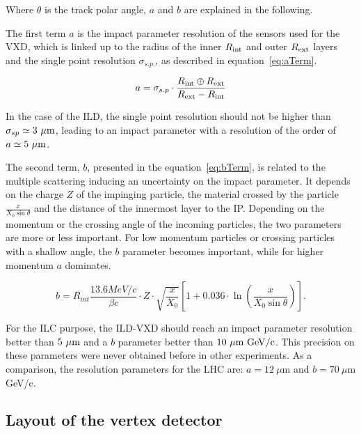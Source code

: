     Where $\theta$ is the track polar angle, $a$ and $b$ are explained in the following.

   The first term $a$ is the impact parameter resolution of the sensors used for the \gls{VXD}, which is linked up to the radius of the inner $R_{\rm{int}}$ and outer $R_{\rm{ext}}$ layers and the single point resolution $\sigma_{s.p.}$, as described in equation~\ref{eq:aTerm}.

   \begin{equation}
     a = \sigma_{s.p} \cdot \frac{R_{\rm{int}} \oplus R_{\rm{ext}}}{R_{\rm{ext}} - R_{\rm{int}}}
     \label{eq:aTerm}
   \end{equation}

    In the case of the \gls{ILD}, the single point resolution should not be higher than $\sigma_{sp} \simeq 3~\rm{\mu m}$, leading to an impact parameter with a resolution of the order of $a \simeq 5~\rm{\mu m}$.
   
    The second term, $b$, presented in the equation~\ref{eq:bTerm}, is related to the multiple scattering inducing an uncertainty on the impact parameter.
    It depends on the charge $Z$ of the impinging particle, the material crossed by the particle $\frac{x}{X_0 \sin{\theta}}$ and the distance of the innermost layer to the \gls{IP}.
    Depending on the momentum or the crossing angle of the incoming particles, the two parameters are more or less important.
    For low momentum particles or crossing particles with a shallow angle, the $b$ parameter becomes important, while for higher momentum $a$ dominates.


    \begin{equation}
      b = R_{int} \frac{13.6 MeV/c}{\beta c} \cdot Z \cdot \sqrt{\frac{x}{X_{0}}} \left[ 1 + 0.036 \cdot \ln{ \left( \frac{x}{X_{0}\sin{\theta}} \right)} \right].
      \label{eq:bTerm}
    \end{equation}
   
   For the \gls{ILC} purpose, the \gls{ILD}-\gls{VXD} should reach an impact parameter resolution better than $5~\rm{\mu m}$ and a $b$ parameter better than $10~\rm{\mu m~GeV/c}$. 
   This precision on these parameters were never obtained before in other experiments.
   As a comparison, the resolution parameters for the \gls{LHC} are: $a =  12 \ \mu$m and $b = 70 \ \mu$m GeV/c. 

   \subsection{Layout of the vertex detector}


